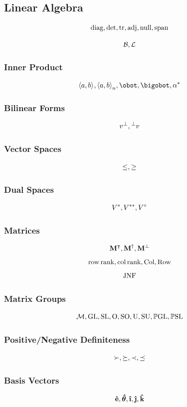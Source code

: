 \documentclass{article}
\begin{document}
\subsection{Linear Algebra}
\[
    \operatorname{diag}, \det, \tr, \operatorname{adj}, \operatorname{null}, \operatorname{span}
\]

\[
    \mathcal{B}, \mathcal{L}
\]

\subsubsection{Inner Product}
\[
    \inner{a}{b}, \inner[n]{a}{b}, \obot, \bigobot, \adjoint{\alpha}
\]

\subsubsection{Bilinear Forms}
\[
    v^{\perp}, \prescript{\perp}{}v
\]

\subsubsection{Vector Spaces}
\[
    \leq, \geq
\]

\subsubsection{Dual Spaces}
\[
    V^{\ast}, V^{\ast\ast}, V^{\circ}
\]

\subsubsection{Matrices}
\[
    \vb{M}^{\intercal}, \vb{M}^{\dagger}, \vb{M}^{\perp}
\]
\[
    \operatorname{row\,rank}, \operatorname{col\,rank}, \operatorname{Col}, \operatorname{Row}
\]
\[
    \operatorname{JNF}
\]

\subsubsection{Matrix Groups}
\[
    \mathcal{M}, \operatorname{GL}, \operatorname{SL}, \operatorname{O}, \operatorname{SO}, \operatorname{U}, \operatorname{SU}, \mathbb{P}\mathrm{GL}, \mathbb{P}\mathrm{SL}
\]

\subsubsection{Positive/Negative Definiteness}
\[
    \succ, \succeq, \prec, \preceq
\]

\subsubsection{Basis Vectors}
\[
    \unitv{e}, \unitv*{\theta}, \ihat, \jhat, \khat
\]
\end{document}
